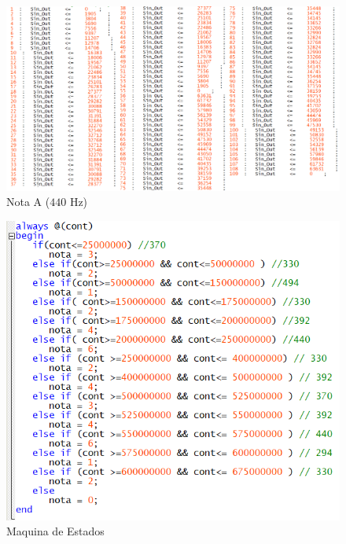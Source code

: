 \documentclass[14pt, oneside]{book}
\theoremstyle{definition}
\begin{document}
                    \begin{figure}[!h]
                        \centering
                        \includegraphics[scale=0.7]{a.png}
                        \caption{Nota A ($440$ Hz)}
                        \label{fig:a}
                    \end{figure}
                    
                    \begin{figure}[!h]
                        \centering
                        \includegraphics[scale=0.7]{maquina.png}
                        \caption{Maquina de Estados}
                        \label{fig:maquina}
                    \end{figure}
                
\end{document}
